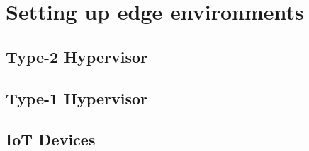 
\section{Setting up edge environments}
\subsection{Type-2 Hypervisor}
\subsection{Type-1 Hypervisor}
\subsection{IoT Devices}




\iffalse
Unikernels can be booted only in systems that either have a type-1 or a type-2 hypervisor. While they can be booted directly from BIOS on hardware, this does not give the flexibility required by cloud computing standards so a hypervisor is required to boot up and remove programs to achieve the desired state by the system.

Type-2 hypervisors run on a host operating system and they are easier to work with. If they provide an API, the host operating system can be used to develop programs to communicate with them. Given an example , a linux machine with virtualbox installed can boot up unikernel programs with terminal commands and no GUI is required. Then ,this terminal commands can be automated with a program that communicates with the internet.

For type-1 hypervisors, the task at hand is harder. There is no operating system involved and one has to work mostly with the API provided by the hypervisor itself. This calls for a program that either can be deployed to the hypervisor as a unikernel itself or for a virtual machine that can talk with the underlying hypervisor.
\fi